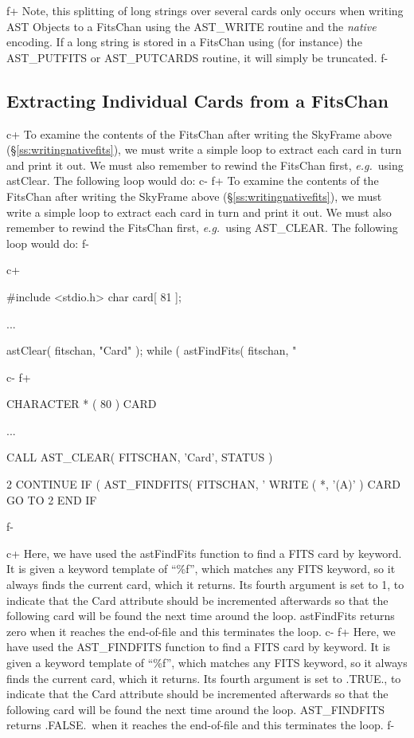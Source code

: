 \documentclass[twoside,11pt]{starlink}
\providecommand{\secref}[1]{\S\ref{#1}}
\begin{document}
{f+
Note, this splitting of long strings over several cards only occurs when
writing AST Objects to a FitsChan using the AST\_WRITE routine and the
\emph{native} encoding. If a long string is stored in a FitsChan using
(for instance) the AST\_PUTFITS or AST\_PUTCARDS routine, it will simply be truncated.
f-

\subsection{\label{ss:extractingfitscards}Extracting Individual Cards from a FitsChan}

c+
To examine the contents of the FitsChan after writing the SkyFrame
above (\secref{ss:writingnativefits}), we must write a simple loop to
extract each card in turn and print it out. We must also remember to
rewind the FitsChan first, \emph{e.g.}\ using astClear. The following
loop would do:
c-
f+
To examine the contents of the FitsChan after writing the SkyFrame
above (\secref{ss:writingnativefits}), we must write a simple loop to
extract each card in turn and print it out. We must also remember to
rewind the FitsChan first, \emph{e.g.}\ using AST\_CLEAR. The
following loop would do:
f-

c+
\small
\begin{terminalv}
#include <stdio.h>
char card[ 81 ];

...

astClear( fitschan, "Card" );
while ( astFindFits( fitschan, "%
\end{terminalv}
\normalsize
c-
f+
\small
\begin{terminalv}
      CHARACTER * ( 80 ) CARD

      ...

      CALL AST_CLEAR( FITSCHAN, 'Card', STATUS )

 2    CONTINUE
      IF ( AST_FINDFITS( FITSCHAN, '%
         WRITE ( *, '(A)' ) CARD
         GO TO 2
      END IF
\end{terminalv}
\normalsize
f-

c+
Here, we have used the astFindFits function to find a FITS card by
keyword. It is given a keyword template of ``\%f'', which matches any
FITS keyword, so it always finds the current card, which it
returns. Its fourth argument is set to 1, to indicate that the Card
attribute should be incremented afterwards so that the following card
will be found the next time around the loop. astFindFits returns zero
when it reaches the end-of-file and this terminates the loop.
c-
f+
Here, we have used the AST\_FINDFITS function to find a FITS card by
keyword. It is given a keyword template of ``\%f'', which matches any
FITS keyword, so it always finds the current card, which it
returns. Its fourth argument is set to .TRUE., to indicate that the
Card attribute should be incremented afterwards so that the following
card will be found the next time around the loop. AST\_FINDFITS
returns .FALSE.\ when it reaches the end-of-file and this terminates
the loop.
f-

}
\end{document}
